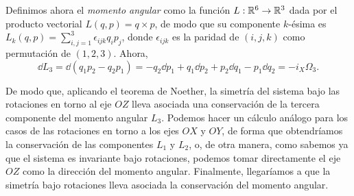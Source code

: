 \begin{ejemplo}
    Definimos ahora el \emph{momento angular} como la función $L:\mathbb{R}^6 \rightarrow \mathbb{R}^3$ dada por el producto vectorial $L(q,p)=q\times p$, de modo que su componente $k$-ésima es $L_k(q,p)=\sum_{i,j=1}^3 \epsilon_{ijk}q_ip_j$, donde $\epsilon_{ijk}$ es la paridad de $(i,j,k)$ como permutación de $(1,2,3)$. Ahora, 
    \begin{equation*}
      \dd L_3 = \dd (q_1p_2 - q_2p_1)=-q_2 \dd p_1 + q_1 \dd p_2 + p_2 \dd q_1 - p_1 \dd q_2 = -i_X\Omega_3.
    \end{equation*}

    De modo que, aplicando el teorema de Noether, la simetría del sistema bajo las rotaciones en torno al eje $OZ$ lleva asociada una conservación de la tercera componente del momento angular $L_3$. Podemos hacer un cálculo análogo para los casos de las rotaciones en torno a los ejes $OX$ y $OY$, de forma que obtendríamos la conservación de las componentes $L_1$ y $L_2$, o, de otra manera, como sabemos ya que el sistema es invariante bajo rotaciones, podemos tomar directamente el eje $OZ$ como la dirección del momento angular. Finalmente, llegaríamos a que la simetría bajo rotaciones lleva asociada la conservación del momento angular.
\end{ejemplo}
